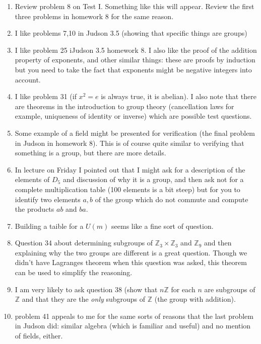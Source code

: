 \documentclass[12pt]{article}
\begin{document}
\begin{enumerate}

\item  Review problem 8 on Test I.  Something like this will appear.  Review the first three problems in homework 8 for the same reason.

\item I like problems 7,10 in Judson 3.5 (showing that specific things are groups)

\item I like problem 25 iJudson 3.5 homework 8.  I also like the proof of the addition property of exponents, and other similar things:  these are proofs by induction but you need to take the fact that exponents might be negative integers into account.

\item I like problem 31 (if $x^2=e$ is always true, it is abelian).  I also note that there are theorems in the introduction to group theory (cancellation laws for example, uniqueness of identity or inverse) which are possible test questions.

\item Some example of a field might be presented for verification (the final problem in Judson in homework 8).  This is of course quite similar to verifying that something is a group, but there are more details.

\item  In lecture on Friday I pointed out that I might ask for a description of the elements of $D_5$ and discussion of why it is a group, and then ask not for a complete multiplication table (100 elements is a bit steep) but for you to identify two elements $a,b$ of the group which do not commute and compute the products $ab$ and $ba$.

\item  Building a taible for a $U(m)$ seems like a fine sort of question.

\item Question 34 about determining subgroups of $\mathbb Z_3 \times \mathbb Z_3$ and $\mathbb Z_9$ and then explaining why the two groups are different is a great question.  Though we didn't have Lagranges theorem when this question was asked, this theorem can be used to simplify the reasoning.

\item  I am very likely to ask question 38 (show that $n\mathbb Z$ for each $n$ are subgroups of $\mathbb Z$ and that they are the {\em only\/} subgroups of $\mathbb Z$ (the group with addition).

\item problem 41 appeals to me for the same sorts of reasons that the last problem in Judson did:  similar algebra (which is familiar and useful) and no mention of fields, either.

\end{enumerate}
\end{document}
